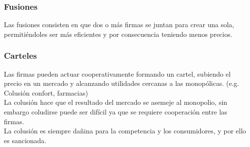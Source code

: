 \subsubsection{Fusiones}
Las fusiones consisten en que dos o más firmas se juntan para crear una sola, permitiéndoles ser más eficientes y por consecuencia teniendo menos precios.

\subsubsection{Carteles}
Las firmas pueden actuar cooperativamente formando un cartel, subiendo el precio en un mercado y alcanzando utilidades cercanas a las monopólicas. (e.g. Colusión confort, farmacias)\\

La colusión hace que el resultado del mercado se asemeje al monopolio, sin embargo coludirse puede ser difícil ya que se requiere cooperación entre las firmas.\\

La colusión es siempre dañina para la competencia y los consumidores, y por ello es sancionada.


\newpage